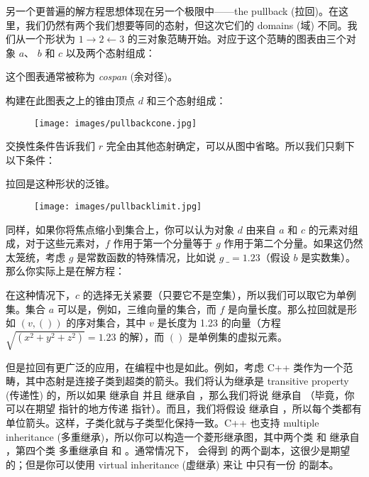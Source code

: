 另一个更普遍的解方程思想体现在另一个极限中——the pullback (拉回)。在这里，我们仍然有两个我们想要等同的态射，但这次它们的 domains (域) 不同。我们从一个形状为 $1\rightarrow2\leftarrow3$ 的三对象范畴开始。对应于这个范畴的图表由三个对象 $a$、 $b$ 和 $c$ 以及两个态射组成：


这个图表通常被称为 \emph{cospan} (余对径)。

构建在此图表之上的锥由顶点 $d$ 和三个态射组成：


\begin{figure}[H]
  \centering
  \texttt{[image: images/pullbackcone.jpg]}
\end{figure}

\noindent
交换性条件告诉我们 $r$ 完全由其他态射确定，可以从图中省略。所以我们只剩下以下条件：

拉回是这种形状的泛锥。

\begin{figure}[H]
  \centering
  \texttt{[image: images/pullbacklimit.jpg]}
\end{figure}

\noindent
同样，如果你将焦点缩小到集合上，你可以认为对象 $d$ 由来自 $a$ 和 $c$ 的元素对组成，对于这些元素对，$f$ 作用于第一个分量等于 $g$ 作用于第二个分量。如果这仍然太笼统，考虑 $g$ 是常数函数的特殊情况，比如说 $g~\_ = 1.23$（假设 $b$ 是实数集）。那么你实际上是在解方程：


在这种情况下，$c$ 的选择无关紧要（只要它不是空集），所以我们可以取它为单例集。集合 $a$ 可以是，例如，三维向量的集合，而 $f$ 是向量长度。那么拉回就是形如 $(v, ())$ 的序对集合，其中 $v$ 是长度为 1.23 的向量（方程 $\sqrt{(x^{2}+y^{2}+z^{2})} = 1.23$ 的解），而 $()$ 是单例集的虚拟元素。

但是拉回有更广泛的应用，在编程中也是如此。例如，考虑 C++ 类作为一个范畴，其中态射是连接子类到超类的箭头。我们将认为继承是 transitive property (传递性) 的，所以如果  继承自  并且  继承自 ，那么我们将说  继承自 （毕竟，你可以在期望  指针的地方传递  指针）。而且，我们将假设  继承自 ，所以每个类都有单位箭头。这样，子类化就与子类型化保持一致。C++ 也支持 multiple inheritance (多重继承)，所以你可以构造一个菱形继承图，其中两个类  和  继承自 ，第四个类  多重继承自  和 。通常情况下， 会得到  的两个副本，这很少是期望的；但是你可以使用 virtual inheritance (虚继承) 来让  中只有一份  的副本。

